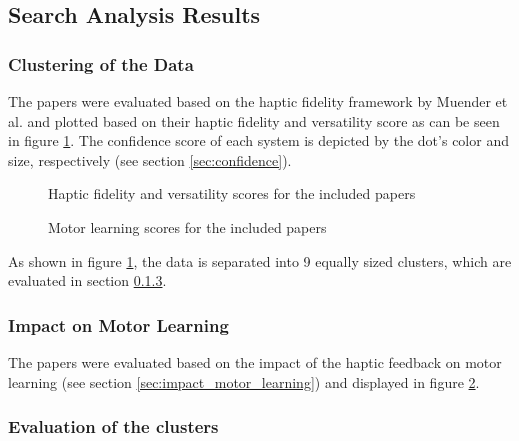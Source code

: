 \subsection{Search Analysis Results}

\subsubsection{Clustering of the Data}
The papers were evaluated based on the haptic fidelity framework by Muender et al. \cite{Muender2022HapticReality} and plotted based on their haptic fidelity and versatility score as can be seen in figure \ref{fig:fidelity_plot}. The confidence score of each system is depicted by the dot's color and size, respectively (see section \ref{sec:confidence}). 

\begin{figure}[!htbp]
\resizebox{0.99\textwidth}{!}{}
\caption{Haptic fidelity and versatility scores for the included papers}
\label{fig:fidelity_plot}
\end{figure}

\begin{figure}[!htbp]
\resizebox{0.99\textwidth}{!}{}
\caption{Motor learning scores for the included papers}
\label{fig:motorlearning_plot}
\end{figure}


As shown in figure \ref{fig:fidelity_plot}, the data is separated into 9 equally sized clusters, which are evaluated in section \ref{sec:evaluation_clusters}.


\subsubsection{Impact on Motor Learning}
The papers were evaluated based on the impact of the haptic feedback on motor learning (see section \ref{sec:impact_motor_learning}) and displayed in figure \ref{fig:motorlearning_plot}.


\subsubsection{Evaluation of the clusters}
\label{sec:evaluation_clusters}

